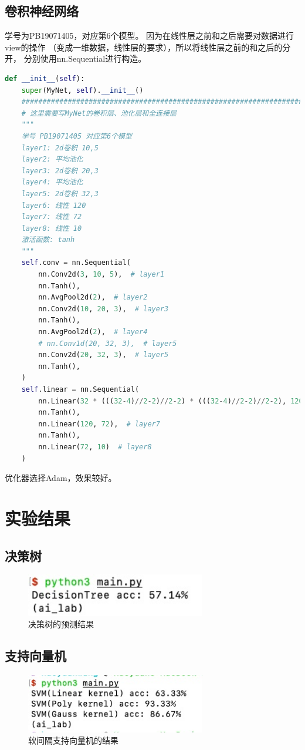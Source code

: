 \documentclass[UTF8]{article}
\begin{document}
    \subsection{卷积神经网络}
    学号为PB19071405，对应第6个模型。
    因为在线性层之前和之后需要对数据进行{\jetbrains view}的操作
    （变成一维数据，线性层的要求），所以将线性层之前的和之后的分开，
    分别使用{\jetbrains nn.Sequential}进行构造。
    \begin{lstlisting}[language=python]
def __init__(self):
    super(MyNet, self).__init__()
    ########################################################################
    # 这里需要写MyNet的卷积层、池化层和全连接层
    """
    学号 PB19071405 对应第6个模型
    layer1: 2d卷积 10,5
    layer2: 平均池化
    layer3: 2d卷积 20,3
    layer4: 平均池化
    layer5: 2d卷积 32,3
    layer6: 线性 120
    layer7: 线性 72
    layer8: 线性 10
    激活函数: tanh
    """
    self.conv = nn.Sequential(
        nn.Conv2d(3, 10, 5),  # layer1
        nn.Tanh(),
        nn.AvgPool2d(2),  # layer2
        nn.Conv2d(10, 20, 3),  # layer3
        nn.Tanh(),
        nn.AvgPool2d(2),  # layer4
        # nn.Conv1d(20, 32, 3),  # layer5
        nn.Conv2d(20, 32, 3),  # layer5
        nn.Tanh(),
    )
    self.linear = nn.Sequential(
        nn.Linear(32 * (((32-4)//2-2)//2-2) * (((32-4)//2-2)//2-2), 120),  # layer6
        nn.Tanh(),
        nn.Linear(120, 72),  # layer7
        nn.Tanh(),
        nn.Linear(72, 10)  # layer8
    ) 
    \end{lstlisting}
    优化器选择{\jetbrains Adam}，效果较好。
    \section{实验结果}
    \subsection{决策树}
    \begin{figure}[H]
        \centering
        \includegraphics[width=0.7\textwidth]{./figs/decisiontree_result.jpg}
        \caption{决策树的预测结果}
    \end{figure}
    \subsection{支持向量机}
    \begin{figure}[H]
        \centering
        \includegraphics[width=0.7\textwidth]{./figs/svm_result.jpg}
        \caption{软间隔支持向量机的结果}
    \end{figure}
\end{document}

